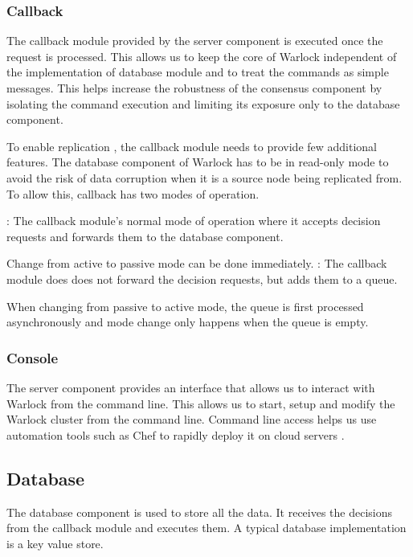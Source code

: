 \subsubsection{Callback}

The callback module provided by the server component
is executed once the request is
processed. This allows us to keep the core of Warlock independent of the
implementation of database module and to treat the commands as simple messages.
This helps increase the robustness of the consensus component by isolating the
command execution and limiting its exposure only to the database component.

To enable replication , the
callback module needs to provide few additional features. The database
component of Warlock has to be in read-only mode to avoid the risk of
data corruption when it is a source node being replicated from. To allow
this, callback has two modes of operation.

\begin{enumerate}
    : The callback module's normal mode of operation where it
    accepts decision requests and forwards them to the database component.

    Change from active to passive mode can be done immediately.
    : The callback module does does not forward the decision
    requests, but adds them to a queue.

    When changing from passive to active mode, the queue is first processed
    asynchronously and mode change only happens when the queue is empty.
\end{enumerate}

\subsubsection{Console}

The server component provides an interface that allows us to interact with
Warlock from the command line. This allows us to start, setup and modify the
Warlock cluster from the command line. Command line access helps us use
automation tools such as Chef \citep{Chef} to rapidly deploy it on cloud servers
\citep{Armbrust:2010:VCC:1721654.1721672, amazonAWS}.

\subsection{Database}

The database component is used to store all the data. It receives the
decisions from the callback module and executes them. A typical database
implementation is a key value store.

